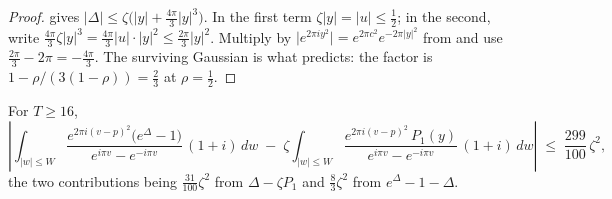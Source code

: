 \begin{proof}
\leanok
{}
 gives $\lvert\Delta\rvert\le\zeta\bigl(\lvert
y\rvert+\tfrac{4\pi}3\lvert y\rvert^{3}\bigr)$.  In the first term $\zeta\lvert
y\rvert=\lvert u\rvert\le\tfrac12$; in the second, write $\tfrac{4\pi}3\zeta\lvert
y\rvert^{3}=\tfrac{4\pi}3\lvert u\rvert\cdot\lvert y\rvert^{2}\le\tfrac{2\pi}3\lvert
y\rvert^{2}$.  Multiply by $\lvert e^{2\pi iy^{2}}\rvert=e^{2\pi c^{2}}e^{-2\pi\lvert
y\rvert^{2}}$ from  and use
$\tfrac{2\pi}3-2\pi=-\tfrac{4\pi}3$.  The surviving Gaussian is what
 predicts: the factor is $1-\rho/(3(1-\rho))=\tfrac23$ at
$\rho=\tfrac12$.
\end{proof}

\begin{lemma}
\label{lem:rsf_inner_sharp}
\leanok
{}
For $T\ge16$,
\[
  \left\lvert\int_{\lvert w\rvert\le W}
    \frac{e^{2\pi i(v-p)^{2}}\bigl(e^{\Delta}-1\bigr)}{e^{i\pi v}-e^{-i\pi v}}\,(1+i)\,dw
   \;-\;\zeta\int_{\lvert w\rvert\le W}
    \frac{e^{2\pi i(v-p)^{2}}\,P_{1}(y)}{e^{i\pi v}-e^{-i\pi v}}\,(1+i)\,dw\right\rvert
  \;\le\;\frac{299}{100}\,\zeta^{2} ,
\]
the two contributions being $\tfrac{31}{100}\zeta^{2}$ from $\Delta-\zeta P_{1}$ and
$\tfrac83\zeta^{2}$ from $e^{\Delta}-1-\Delta$.
\end{lemma}

